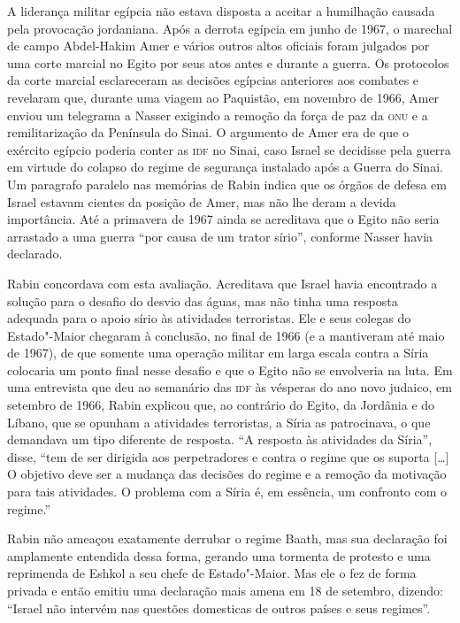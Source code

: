 A liderança militar egípcia não estava disposta a aceitar a humilhação
causada pela provocação jordaniana. Após a derrota egípcia em junho de
1967, o marechal de campo Abdel-Hakim Amer e vários outros altos
oficiais foram julgados por uma corte marcial no Egito por seus atos
antes e durante a guerra. Os protocolos da corte marcial esclareceram as
decisões egípcias anteriores aos combates e revelaram que, durante uma
viagem ao Paquistão, em novembro de 1966, Amer enviou um telegrama a
Nasser exigindo a remoção da força de paz da \textsc{onu} e a remilitarização da
Península do Sinai. O argumento de Amer era de que o exército egípcio
poderia conter as \textsc{idf} no Sinai, caso Israel se decidisse pela guerra em
virtude do colapso do regime de segurança instalado após a Guerra do
Sinai. Um paragrafo paralelo nas memórias de Rabin indica que os órgãos
de defesa em Israel estavam cientes da posição de Amer, mas não lhe
deram a devida importância. Até a primavera de 1967 ainda se acreditava
que o Egito não seria arrastado a uma guerra ``por causa de um trator
sírio'', conforme Nasser havia declarado.

Rabin concordava com esta avaliação. Acreditava que Israel havia
encontrado a solução para o desafio do desvio das águas, mas não tinha
uma resposta adequada para o apoio sírio às atividades terroristas. Ele
e seus colegas do Estado"-Maior chegaram à conclusão, no final de 1966 (e
a mantiveram até maio de 1967), de que somente uma operação militar em larga
escala contra a Síria colocaria um ponto final nesse desafio e que o
Egito não se envolveria na luta. Em uma entrevista que deu ao semanário
das \textsc{idf} às vésperas do ano novo judaico, em setembro de 1966, Rabin
explicou que, ao contrário do Egito, da Jordânia e do Líbano, que se
opunham a atividades terroristas, a Síria as patrocinava, o que
demandava um tipo diferente de resposta. ``A resposta às atividades da
Síria'', disse, ``tem de ser dirigida aos perpetradores e contra o
regime que os suporta {[}\ldots{}{]} O objetivo deve ser a mudança das decisões do
regime e a remoção da motivação para tais atividades. O problema com a
Síria é, em essência, um confronto com o regime.''

Rabin não ameaçou exatamente derrubar o regime Baath, mas sua
declaração foi amplamente entendida dessa forma, gerando uma tormenta de
protesto e uma reprimenda de Eshkol a seu chefe de Estado"-Maior. Mas ele
o fez de forma privada e então emitiu uma declaração mais amena em 18 de
setembro, dizendo: ``Israel não intervém nas questões domesticas de
outros países e seus regimes''.

